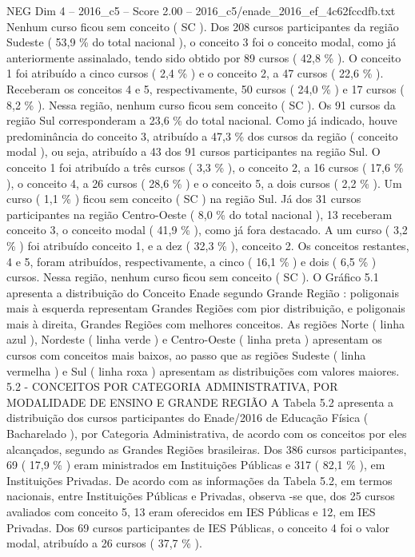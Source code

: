 \begin{textsample}{NEG Dim 4 – 2016\_c5 – Score 2.00 – 2016\_c5/enade\_2016\_ef\_4c62fccdfb.txt}
Nenhum curso ficou sem conceito ( SC ).
Dos 208 cursos participantes da região Sudeste ( 53,9 \% do total nacional ), o conceito 3 foi o conceito modal, como já anteriormente assinalado, tendo sido obtido por 89 cursos ( 42,8 \% ).
O conceito 1 foi atribuído a cinco cursos ( 2,4 \% ) e o conceito 2, a 47 cursos ( 22,6 \% ).
Receberam os conceitos 4 e 5, respectivamente, 50 cursos ( 24,0 \% ) e 17 cursos ( 8,2 \% ).
Nessa região, nenhum curso ficou sem conceito ( SC ).
Os 91 cursos da região Sul corresponderam a 23,6 \% do total nacional.
Como já indicado, houve predominância do conceito 3, atribuído a 47,3 \% dos cursos da região ( conceito modal ), ou seja, atribuído a 43 dos 91 cursos participantes na região Sul.
O conceito 1 foi atribuído a três cursos ( 3,3 \% ), o conceito 2, a 16 cursos ( 17,6 \% ), o conceito 4, a 26 cursos ( 28,6 \% ) e o conceito 5, a dois cursos ( 2,2 \% ).
Um curso ( 1,1 \% ) ficou sem conceito ( SC ) na região Sul.
Já dos 31 cursos participantes na região Centro-Oeste ( 8,0 \% do total nacional ), 13 receberam conceito 3, o conceito modal ( 41,9 \% ), como já fora destacado.
A um curso ( 3,2 \% ) foi atribuído conceito 1, e a dez ( 32,3 \% ), conceito 2.
Os conceitos restantes, 4 e 5, foram atribuídos, respectivamente, a cinco ( 16,1 \% ) e dois ( 6,5 \% ) cursos.
Nessa região, nenhum curso ficou sem conceito ( SC ).
O Gráfico 5.1 apresenta a distribuição do Conceito Enade segundo Grande Região : poligonais mais à esquerda representam Grandes Regiões com pior distribuição, e poligonais mais à direita, Grandes Regiões com melhores conceitos.
As regiões Norte ( linha azul ), Nordeste ( linha verde ) e Centro-Oeste ( linha preta ) apresentam os cursos com conceitos mais baixos, ao passo que as regiões Sudeste ( linha vermelha ) e Sul ( linha roxa ) apresentam as distribuições com valores maiores. 5.2 - CONCEITOS POR CATEGORIA ADMINISTRATIVA, POR MODALIDADE DE ENSINO E GRANDE REGIÃO A Tabela 5.2 apresenta a distribuição dos cursos participantes do Enade/2016 de Educação Física ( Bacharelado ), por Categoria Administrativa, de acordo com os conceitos por eles alcançados, segundo as Grandes Regiões brasileiras.
Dos 386 cursos participantes, 69 ( 17,9 \% ) eram ministrados em Instituições Públicas e 317 ( 82,1 \% ), em Instituições Privadas.
De acordo com as informações da Tabela 5.2, em termos nacionais, entre Instituições Públicas e Privadas, observa -se que, dos 25 cursos avaliados com conceito 5, 13 eram oferecidos em IES Públicas e 12, em IES Privadas.
Dos 69 cursos participantes de IES Públicas, o conceito 4 foi o valor modal, atribuído a 26 cursos ( 37,7 \% ).

\end{textsample}
